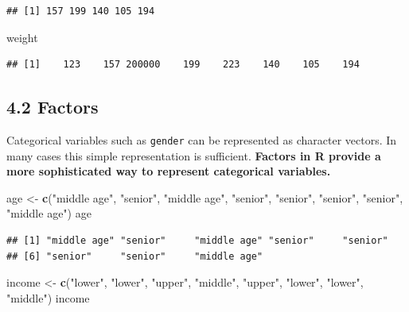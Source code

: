 \documentclass[]{article}
\newenvironment{Shaded}{\begin{snugshade}}{\end{snugshade}}
\newcommand{\KeywordTok}[1]{\textcolor[rgb]{0.13,0.29,0.53}{\textbf{#1}}}
\newcommand{\StringTok}[1]{\textcolor[rgb]{0.31,0.60,0.02}{#1}}
\newcommand{\NormalTok}[1]{#1}
\begin{document}
\begin{verbatim}
## [1] 157 199 140 105 194
\end{verbatim}

\begin{Shaded}
\begin{Highlighting}[]
\NormalTok{weight}
\end{Highlighting}
\end{Shaded}

\begin{verbatim}
## [1]    123    157 200000    199    223    140    105    194
\end{verbatim}

\subsection{4.2 Factors}\label{factors}

Categorical variables such as \texttt{gender} can be represented as
character vectors. In many cases this simple representation is
sufficient. \textbf{Factors in R provide a more sophisticated way to
represent categorical variables.}

\begin{Shaded}
\begin{Highlighting}[]
\NormalTok{age <-}\StringTok{ }\KeywordTok{c}\NormalTok{(}\StringTok{"middle age"}\NormalTok{, }\StringTok{"senior"}\NormalTok{, }\StringTok{"middle age"}\NormalTok{, }\StringTok{"senior"}\NormalTok{, }\StringTok{"senior"}\NormalTok{, }\StringTok{"senior"}\NormalTok{, }\StringTok{"senior"}\NormalTok{, }\StringTok{"middle age"}\NormalTok{)}
\NormalTok{age}
\end{Highlighting}
\end{Shaded}

\begin{verbatim}
## [1] "middle age" "senior"     "middle age" "senior"     "senior"    
## [6] "senior"     "senior"     "middle age"
\end{verbatim}

\begin{Shaded}
\begin{Highlighting}[]
\NormalTok{income <-}\StringTok{ }\KeywordTok{c}\NormalTok{(}\StringTok{"lower"}\NormalTok{, }\StringTok{"lower"}\NormalTok{, }\StringTok{"upper"}\NormalTok{, }\StringTok{"middle"}\NormalTok{, }\StringTok{"upper"}\NormalTok{, }\StringTok{"lower"}\NormalTok{, }\StringTok{"lower"}\NormalTok{, }\StringTok{"middle"}\NormalTok{)}
\NormalTok{income}
\end{Highlighting}
\end{Shaded}
\end{document}
